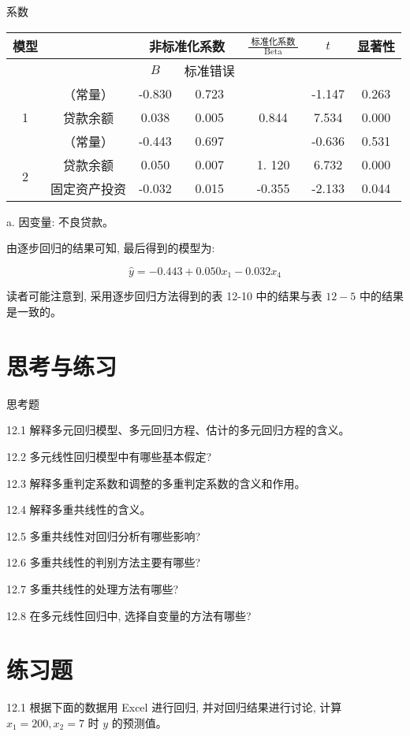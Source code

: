 \documentclass[10pt]{article}
\begin{document}
\begin{CJK*}{UTF8}{bsmi}
系数

\begin{center}
\begin{tabular}{|c|c|c|c|c|c|c|}
\hline
\multirow{2}{*}{模型} &  & \multicolumn{2}{|c|}{非标准化系数} & \multirow{2}{*}{$\frac{\text { 标准化系数 }}{\text { Beta }}$} & \multirow{2}{*}{$t$} & \multirow{2}{*}{显著性} \\
\hline
 &  & $B$ & 标准错误 &  &  &  \\
\hline
\multirow{3}{*}{1} & （常量） & -0.830 & 0.723 &  & -1.147 & 0.263 \\
\hline
 & 贷款余额 & 0.038 & 0.005 & 0.844 & 7.534 & 0.000 \\
\hline
 & （常量） & -0.443 & 0.697 &  & -0.636 & 0.531 \\
\hline
\multirow[t]{2}{*}{2} & 贷款余额 & 0.050 & 0.007 & 1. 120 & 6.732 & 0.000 \\
\hline
 & 固定资产投资 & -0.032 & 0.015 & -0.355 & -2.133 & 0.044 \\
\hline
\end{tabular}
\end{center}

a. 因变量: 不良贷款。

由逐步回归的结果可知, 最后得到的模型为:

$$
\hat{y}=-0.443+0.050 x_{1}-0.032 x_{4}
$$

读者可能注意到, 采用逐步回归方法得到的表 12-10 中的结果与表 $12-5$ 中的结果是一致的。

\section*{思考与练习}
思考题

12.1 解释多元回归模型、多元回归方程、估计的多元回归方程的含义。

12.2 多元线性回归模型中有哪些基本假定?

12.3 解释多重判定系数和调整的多重判定系数的含义和作用。

12.4 解释多重共线性的含义。

12.5 多重共线性对回归分析有哪些影响?

12.6 多重共线性的判别方法主要有哪些?

12.7 多重共线性的处理方法有哪些?

12.8 在多元线性回归中, 选择自变量的方法有哪些?

\section*{练习题}
12.1 根据下面的数据用 Excel 进行回归, 并对回归结果进行讨论, 计算 $x_{1}=200, x_{2}=7$ 时 $y$ 的预测值。


\end{CJK*}
\end{document}
